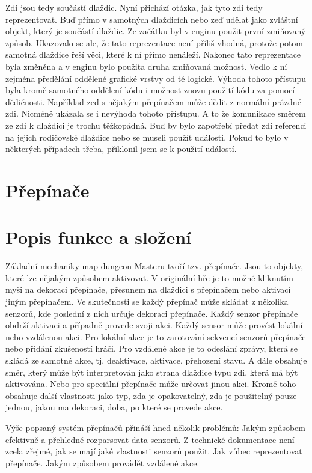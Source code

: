 Zdi jsou tedy součástí dlaždic. Nyní přichází otázka, jak tyto zdi tedy reprezentovat. Buď přímo v samotných dlaždicích nebo
zeď udělat jako zvláštní objekt, který je součástí dlaždic. Ze začátku byl v enginu použit první zmiňovaný způsob. Ukazovalo se ale, 
že tato reprezentace není příliš vhodná, protože potom samotná dlaždice řeší věci, které k ní přímo nenáleží.
Nakonec tato reprezentace byla změněna a v enginu bylo použita druha zmiňovaná možnost. Vedlo k ní zejména předělání oddělené grafické 
vrstvy od té logické. Výhoda tohoto přístupu byla kromě samotného oddělení kódu i možnost znovu použití kódu za pomocí dědičnosti. 
Například zeď s nějakým přepínačem může dědit z normální prázdné zdi. Nicméně ukázala se i nevýhoda tohoto přístupu. A to že komunikace směrem 
ze zdi k dlaždici je trochu těžkopádná. Buď by bylo zapotřebí předat zdi referenci na jejich rodičovské dlaždice nebo se museli použít události.
Pokud to bylo v některých případech třeba, přiklonil jsem se k použití událostí.

\section{Přepínače}
\section{Popis funkce a složení}
Základní mechaniky map dungeon Masteru tvoří tzv. přepínače. Jsou to objekty, které lze nějakým způsobem aktivovat. V originální
hře je to možné kliknutím myši na dekoraci přepínače, přesunem na dlaždici s přepínačem nebo aktivací jiným přepínačem. Ve 
skutečnosti se každý přepínač může skládat z několika senzorů, kde poslední z nich určuje dekoraci přepínače. Každý senzor přepínače
obdrží aktivaci a případně provede svoji akci. Každý sensor může provést lokální nebo vzdálenou akci. Pro lokální akce je to 
zarotování sekvencí senzorů přepínače nebo přidání zkušeností hráči. Pro vzdálené akce je to odeslání zprávy, která se skládá ze samotné akce, tj.
deaktivace, aktivace, přehození stavu. A dále obsahuje směr, který může být interpretován jako strana dlaždice typu zdi, která má 
být aktivována. Nebo pro speciální přepínače může určovat jinou akci. Kromě toho obsahuje další vlastnosti jako typ, zda je opakovatelný, zda je 
použitelný pouze jednou, jakou ma dekoraci, doba, po které se provede akce.

Výše popsaný systém přepínačů přináší hned několik problémů:
	Jakým způsobem efektivně a přehledně rozparsovat data senzorů.
	Z technické dokumentace není zcela zřejmé, jak se mají jaké vlastnosti senzorů použit.
	Jak vůbec reprezentovat přepínače.
	Jakým způsobem provádět vzdálené akce.


